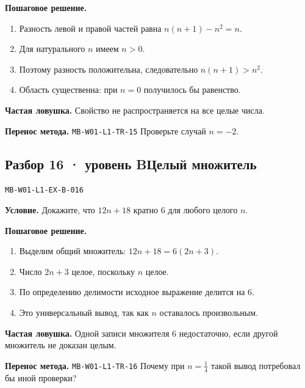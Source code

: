 \documentclass[11pt,a4paper,openany]{book}
\newcommand{\mtag}[1]{\textsf{\small\color{mbaccent}\bfseries #1}}
\newcommand{\muid}[1]{\texttt{\footnotesize #1}}
\begin{document}
\textbf{Пошаговое решение.}\par
\begin{enumerate}[label=\arabic*),leftmargin=*,itemsep=3pt,topsep=4pt]
\item Разность левой и правой частей равна $n(n+1)-n^2=n$.
\item Для натурального $n$ имеем $n>0$.
\item Поэтому разность положительна, следовательно $n(n+1)>n^2$.
\item Область существенна: при $n=0$ получилось бы равенство.
\end{enumerate}


\begin{learnbox}\textbf{Частая ловушка.} Свойство не распространяется на все целые числа.\par \textbf{Перенос метода.} \muid{MB-W01-L1-TR-15} Проверьте случай $n=-2$.\end{learnbox}

\subsection*{\mtag{Разбор 16 · уровень B}\quad Целый множитель}\hypertarget{MB-W01-L1-EX-B-016}{}

\muid{MB-W01-L1-EX-B-016}\par

\begin{keybox}\textbf{Условие.} Докажите, что $12n+18$ кратно $6$ для любого целого $n$.\end{keybox}

\textbf{Пошаговое решение.}\par
\begin{enumerate}[label=\arabic*),leftmargin=*,itemsep=3pt,topsep=4pt]
\item Выделим общий множитель: $12n+18=6(2n+3)$.
\item Число $2n+3$ целое, поскольку $n$ целое.
\item По определению делимости исходное выражение делится на $6$.
\item Это универсальный вывод, так как $n$ оставалось произвольным.
\end{enumerate}


\begin{learnbox}\textbf{Частая ловушка.} Одной записи множителя $6$ недостаточно, если другой множитель не доказан целым.\par \textbf{Перенос метода.} \muid{MB-W01-L1-TR-16} Почему при $n=\tfrac14$ такой вывод потребовал бы иной проверки?\end{learnbox}
\end{document}
